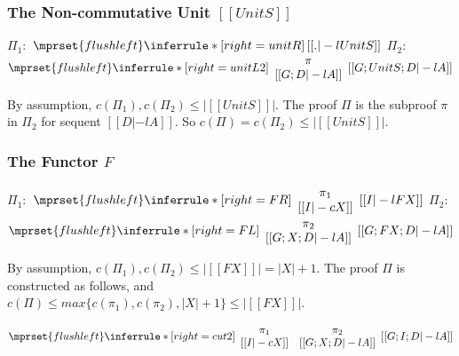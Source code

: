 \subsubsection{The Non-commutative Unit $[[UnitS]]$}
\begin{center}
  \scriptsize
  $\Pi_1:$
  \begin{math}
    $$\mprset{flushleft}
    \inferrule* [right={\tiny unitR}] {
      \,
    }{[[. |-l UnitS]]}
  \end{math}
  \qquad\qquad
  $\Pi_2:$
  \begin{math}
    $$\mprset{flushleft}
    \inferrule* [right={\tiny unitL2}] {
      {
        \begin{array}{c}
          \pi \\
          {[[G; D |-l A]]}
        \end{array}
      }
    }{[[G; UnitS; D |-l A]]}
  \end{math}
\end{center}
By assumption, $c(\Pi_1),c(\Pi_2)\leq |[[UnitS]]|$. The proof $\Pi$ is the
subproof $\pi$ in $\Pi_2$ for sequent $[[D |-l A]]$. So
$c(\Pi)=c(\Pi_2)\leq |[[UnitS]]|$.

\subsubsection{The Functor $F$}
\begin{center}
  \scriptsize
  $\Pi_1:$
  \begin{math}
    $$\mprset{flushleft}
    \inferrule* [right={\tiny FR}] {
      {
        \begin{array}{c}
          \pi_1 \\
          {[[I |-c X]]}
        \end{array}
      }
    }{[[I |-l F X]]}
  \end{math}
  \qquad\qquad
  $\Pi_2:$
  \begin{math}
    $$\mprset{flushleft}
    \inferrule* [right={\tiny FL}] {
      {
        \begin{array}{c}
          \pi_2 \\
          {[[G; X; D |-l A]]}
        \end{array}
      }
    }{[[G; F X; D |-l A]]}
  \end{math}
\end{center}
By assumption, $c(\Pi_1),c(\Pi_2)\leq |[[F X]]| = |X|+1$. The proof
$\Pi$ is constructed as follows, and \\
$c(\Pi)\leq max\{c(\pi_1),c(\pi_2),|X|+1\}\leq |[[F X]]|$.
\begin{center}
  \scriptsize
  \begin{math}
    $$\mprset{flushleft}
    \inferrule* [right={\tiny cut2}] {
      {
        \begin{array}{cc}
          \pi_1 & \pi_2 \\
          {[[I |-c X]]} & {[[G; X; D |-l A]]}
        \end{array}
      }
    }{[[G; I; D |-l A]]}
  \end{math}
\end{center}

